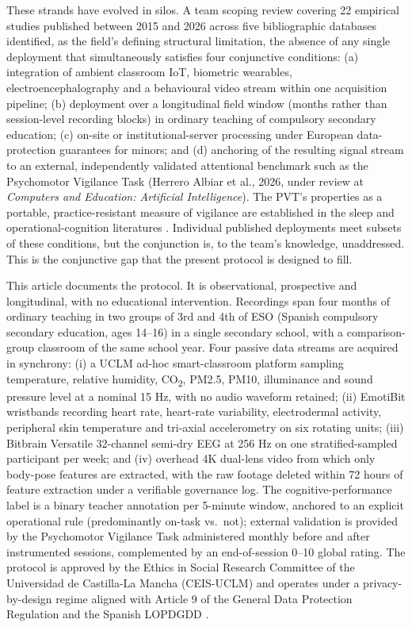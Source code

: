 These strands have evolved in silos. A team scoping review covering 22 empirical studies published between 2015 and 2026 across five bibliographic databases identified, as the field's defining structural limitation, the absence of any single deployment that simultaneously satisfies four conjunctive conditions: (a) integration of ambient classroom IoT, biometric wearables, electroencephalography and a behavioural video stream within one acquisition pipeline; (b) deployment over a longitudinal field window (months rather than session-level recording blocks) in ordinary teaching of compulsory secondary education; (c) on-site or institutional-server processing under European data-protection guarantees for minors; and (d) anchoring of the resulting signal stream to an external, independently validated attentional benchmark such as the Psychomotor Vigilance Task (Herrero Albiar et al., 2026, under review at \emph{Computers and Education: Artificial Intelligence}). The PVT's properties as a portable, practice-resistant measure of vigilance are established in the sleep and operational-cognition literatures \parencite{Dinges1985_pvt,Basner2011_pvt,Loh2004_pvt_short,Basner2018_pvt_practice}. Individual published deployments meet subsets of these conditions, but the conjunction is, to the team's knowledge, unaddressed. This is the conjunctive gap that the present protocol is designed to fill.

This article documents the protocol. It is observational, prospective and longitudinal, with no educational intervention. Recordings span four months of ordinary teaching in two groups of 3rd and 4th of ESO (Spanish compulsory secondary education, ages 14--16) in a single secondary school, with a comparison-group classroom of the same school year. Four passive data streams are acquired in synchrony: (i) a UCLM ad-hoc smart-classroom platform sampling temperature, relative humidity, CO\textsubscript{2}, PM2.5, PM10, illuminance and sound pressure level at a nominal 15 Hz, with no audio waveform retained; (ii) EmotiBit wristbands recording heart rate, heart-rate variability, electrodermal activity, peripheral skin temperature and tri-axial accelerometry on six rotating units; (iii) Bitbrain Versatile 32-channel semi-dry EEG at 256 Hz on one stratified-sampled participant per week; and (iv) overhead 4K dual-lens video from which only body-pose features are extracted, with the raw footage deleted within 72 hours of feature extraction under a verifiable governance log. The cognitive-performance label is a binary teacher annotation per 5-minute window, anchored to an explicit operational rule (predominantly on-task vs.\ not); external validation is provided by the Psychomotor Vigilance Task administered monthly before and after instrumented sessions, complemented by an end-of-session 0--10 global rating. The protocol is approved by the Ethics in Social Research Committee of the Universidad de Castilla-La Mancha (CEIS-UCLM) and operates under a privacy-by-design regime aligned with Article 9 of the General Data Protection Regulation and the Spanish LOPDGDD \parencite{Macenaite2017_minors_gdpr,EDPB2020_consent}.

